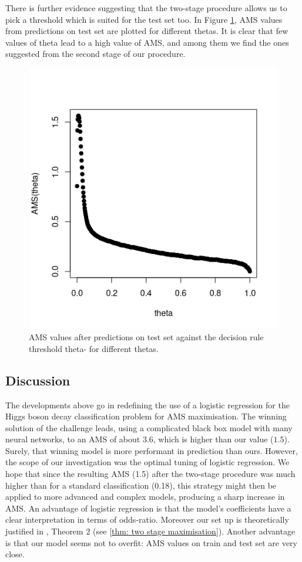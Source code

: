 \documentclass[]{article}
\begin{document}
There is further evidence suggesting that the two-stage procedure allows us to pick a threshold which is suited for the test set too. In Figure \ref{fig: AMS on test}, AMS values from predictions on test set are plotted for different thetas. It is clear that few values of theta lead to a high value of AMS, and among them we find the ones suggested from the second stage of our procedure. 

\begin{figure}[H]
\centering
\includegraphics[scale=0.7]{../Pictures/testbadpractice.png}
\caption{AMS values after predictions on test set against the decision rule threshold theta- for different thetas.}
\label{fig: AMS on test}
\end{figure}

\subsection{Discussion}


The developments above go in redefining the use of a logistic regression for the Higgs boson decay classification problem for AMS maximisation. The winning solution of the challenge leads, using a complicated black box model with many neural networks, to an AMS of about $3.6$, which is higher than our value ($1.5$). Surely, that winning model is more performant in prediction than ours. However, the scope of our investigation was the optimal tuning of logistic regression. We hope that since the resulting AMS (1.5) after the two-stage procedure was much higher than for a standard classification (0.18), this strategy might then be applied to more advanced and complex models, producing a sharp increase in AMS. An advantage of logistic regression is that the model's coefficients have a clear interpretation in terms of odds-ratio. Moreover our set up is theoretically justified in \cite{kotlowski2014consistent}, Theorem 2 (see \ref{thm: two stage maximisation}). Another advantage is that our model seems not to overfit: AMS values on train and test set are very close.




\end{document}
